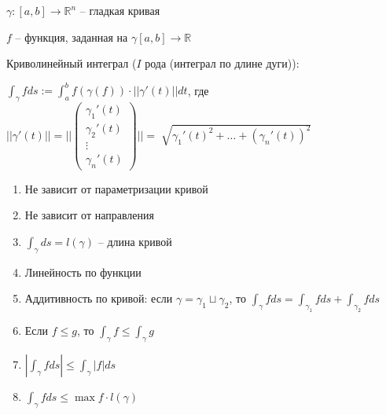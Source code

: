 
\begin{definition}
    $\gamma: [a, b] \to \mathbb{R}^n$ -- гладкая кривая

    $f$ -- функция, заданная на $\gamma[a, b] \to \mathbb{R}$

    Криволинейный интеграл ($I$ рода (интеграл по длине дуги)): 

    $\int_{\gamma}^{}fds := \int_{a}^{b}f(\gamma(f))\cdot ||\gamma'(t)||dt$, где $||\gamma'(t)|| = ||\begin{pmatrix}
        \gamma_1'(t)\\
        \gamma_2'(t)\\
        \vdots\\
        \gamma_n'(t)
    \end{pmatrix}|| = \sqrt[]{\gamma_1'(t)^2 + \dots + (\gamma_n'(t))^2}$
\end{definition}

\begin{theorem}
    \begin{enumerate}
        \item Не зависит от параметризации кривой
        \item Не зависит от направления
        \item $\int_{\gamma}^{}ds = l(\gamma)$ -- длина кривой 
        \item Линейность по функции
        \item Аддитивность по кривой: если $\gamma = \gamma_1 \sqcup \gamma_2$, то $\int_{\gamma}^{}f ds = \int_{\gamma_1}^{}f ds + \int_{\gamma_2}^{}f ds$
        \item Если $f \leq g$, то $\int_{\gamma}^{}f \leq \int_{\gamma}^{}g$
        \item $|\int_{\gamma}^{}f ds| \leq \int_{\gamma}^{}|f|ds$
        \item $\int_{\gamma}^{}fds \leq \max f \cdot l(\gamma)$
    \end{enumerate}
\end{theorem}

